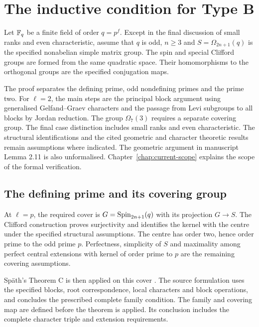 \chapter{The inductive condition for Type B}
\label{chap:current-type-b}

Let $\mathbb F_q$ be a finite field of order $q=p^f$. Except in the final discussion
of small ranks and even characteristic, assume that $q$ is odd, $n\geq3$
and $S=\Omega_{2n+1}(q)$ is the specified nonabelian simple matrix group.
The spin and special Clifford groups are formed from the same quadratic
space. Their homomorphisms to the orthogonal groups are the specified
conjugation maps.

The proof separates the defining prime, odd nondefining primes and the
prime two. For $\ell=2$, the main steps are the principal block argument using
generalised Gelfand--Graev characters and the passage from Levi subgroups
to all blocks by Jordan reduction. The group $\Omega_7(3)$ requires a
separate covering group. The final case distinction includes small ranks
and even characteristic. The structural identifications and the cited
geometric and character theoretic results remain assumptions where
indicated. The geometric argument in manuscript Lemma 2.11 is also
unformalised. Chapter~\ref{chap:current-scope} explains the scope of the
formal verification.

\section{The defining prime and its covering group}

At $\ell=p$, the required cover is
$G=\operatorname{Spin}_{2n+1}(q)$ with its projection $G\longrightarrow S$.
The Clifford construction proves surjectivity and identifies
the kernel with the centre under the specified structural assumptions.
The centre has order two, hence order prime to the odd prime $p$.
Perfectness, simplicity of $S$ and maximality among perfect central
extensions with kernel of order prime to $p$ are the remaining covering
assumptions.

Sp\"ath's Theorem C is then applied on this cover
\cite[Theorem~C and its proof]{Spath2013}.
The source formulation uses the specified blocks, root
correspondence, local characters and block operations, and concludes the
prescribed complete family condition. The family and covering map are defined
before the theorem is applied. Its conclusion includes the complete
character triple and extension requirements.

